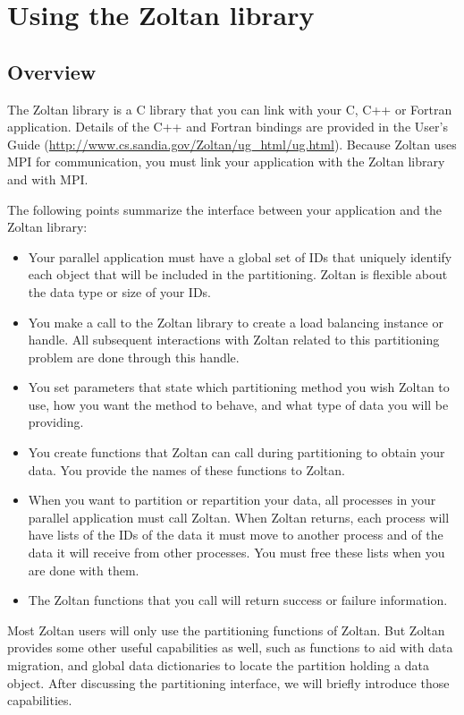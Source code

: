%
% 
\chapter{Using the Zoltan library}
\label{cha:using}


\section{Overview}

The Zoltan library is a C library that you can link with your C,
C++ or Fortran application.  Details of the C++ and Fortran bindings
are provided in the User's Guide 
(\url{http://www.cs.sandia.gov/Zoltan/ug_html/ug.html}).
Because Zoltan uses MPI for communication, you must link your application
with the Zoltan library and with MPI.

The following points summarize the interface between your
application and the Zoltan library:

\begin{itemize}
\item Your parallel application must have a global set of IDs that uniquely identify each object that will be included in the partitioning.  Zoltan is flexible about the data type or size of your IDs.
\item You make a call to the Zoltan library to create a load balancing instance or handle.  All subsequent interactions with Zoltan related to this partitioning problem are done through this handle.  
\item You set parameters that state which partitioning method you wish Zoltan to use, how you want the method to behave, and what type of data you will be providing.
\item You create functions that Zoltan can call during partitioning to obtain your data.  You provide the names of these functions to Zoltan.
\item When you want to partition or repartition your data, all processes in your parallel application must call Zoltan.  When Zoltan returns, each process will have lists of the 
IDs of the data it must move to another process and of the data it will receive from 
other processes.  You must free these lists when you are done with them.
\item The Zoltan functions that you call will return success or failure information.
\end{itemize}

Most Zoltan users will only use the partitioning functions of Zoltan.  But Zoltan provides
some other useful capabilities as well, such as functions to aid with data migration, and
global data dictionaries to locate the partition holding a data object.  
After discussing the partitioning interface, we will briefly introduce those capabilities.

